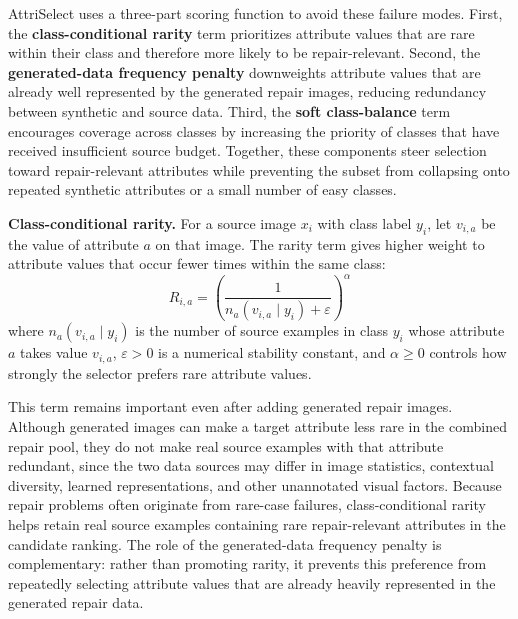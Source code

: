 \documentclass{article}
\newcommand{\model}{AttriSelect\xspace}
\begin{document}
\model uses a three-part scoring function to avoid these failure modes. First, the \textbf{class-conditional rarity} term prioritizes attribute values that are rare within their class and therefore more likely to be repair-relevant. Second, the \textbf{generated-data frequency penalty} downweights attribute values that are already well represented by the generated repair images, reducing redundancy between synthetic and source data. Third, the \textbf{soft class-balance} term encourages coverage across classes by increasing the priority of classes that have received insufficient source budget. Together, these components steer selection toward repair-relevant attributes while preventing the subset from collapsing onto repeated synthetic attributes or a small number of easy classes.

\noindent\textbf{Class-conditional rarity.} For a source image $x_i$ with class label $y_i$, let $v_{i,a}$ be the value of attribute $a$ on that image. The rarity term gives higher weight to attribute values that occur fewer times within the same class:
\begin{equation}
\label{eq:rarity-term}
R_{i,a} = \left(\frac{1}{n_a(v_{i,a}\mid y_i)+\varepsilon}\right)^{\alpha}
\end{equation}
where $n_a(v_{i,a}\mid y_i)$ is the number of source examples in class $y_i$ whose attribute $a$ takes value $v_{i,a}$, $\varepsilon > 0$ is a numerical stability constant, and $\alpha \geq 0$ controls how strongly the selector prefers rare attribute values.

This term remains important even after adding generated repair images. Although generated images can make a target attribute less rare in the combined repair pool, they do not make real source examples with that attribute redundant, since the two data sources may differ in image statistics, contextual diversity, learned representations, and other unannotated visual factors. Because repair problems often originate from rare-case failures, class-conditional rarity helps retain real source examples containing rare repair-relevant attributes in the candidate ranking. The role of the generated-data frequency penalty is complementary: rather than promoting rarity, it prevents this preference from repeatedly selecting attribute values that are already heavily represented in the generated repair data.
\end{document}
